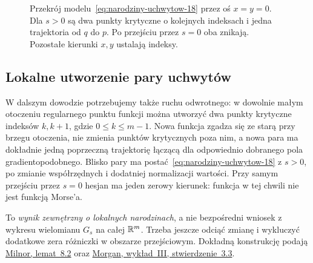\begin{figure}[htbp]
\centering
{}
\caption{Przekrój modelu~\eqref{eq:narodziny-uchwytow-18}
przez oś $x=y=0$. Dla $s>0$ są dwa
punkty krytyczne o kolejnych indeksach
i jedna trajektoria od $q$ do $p$.
Po przejściu przez $s=0$ oba znikają.
Pozostałe kierunki $x,y$ ustalają indeksy.}
\label{fig:znoszenie-uchwytow-18}
\end{figure}

\subsection*{Lokalne utworzenie pary uchwytów}
\label{sec:narodziny-lokalne-23}
W dalszym dowodzie potrzebujemy także ruchu odwrotnego:
w dowolnie małym otoczeniu regularnego punktu funkcji
można utworzyć dwa punkty krytyczne indeksów $k,k+1$,
gdzie $0\leq k\leq m-1$. Nowa funkcja zgadza się ze starą
przy brzegu otoczenia, nie zmienia punktów krytycznych poza nim,
a nowa para ma dokładnie jedną poprzeczną trajektorię łączącą
dla odpowiednio dobranego pola gradientopodobnego.
Blisko pary ma postać~\eqref{eq:narodziny-uchwytow-18}
z $s>0$, po zmianie współrzędnych i dodatniej normalizacji wartości.
Przy samym przejściu przez $s=0$ hesjan ma jeden zerowy kierunek:
funkcja w tej chwili nie jest funkcją Morse'a.

To \emph{wynik zewnętrzny o lokalnych narodzinach}, a nie
bezpośredni wniosek z wykresu wielomianu $G_s$ na całej $\mathbb{R}^m$.
Trzeba jeszcze odciąć zmianę i wykluczyć dodatkowe zera
różniczki w obszarze przejściowym. Dokładną konstrukcję podają
\href{https://webhomes.maths.ed.ac.uk/~v1ranick/surgery/hcobord.pdf}
{Milnor, lemat~8.2} oraz
\href{https://www.math.columbia.edu/~jmorgan/Lecture_III_H-cobordism_Theorem.pdf}
{Morgan, wykład~III, stwierdzenie~3.3}.


